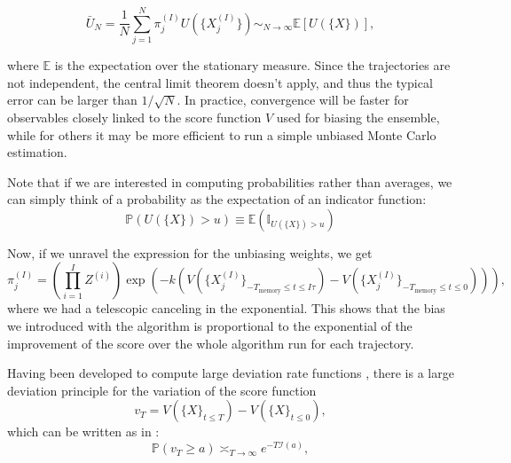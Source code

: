 \begin{equation}\label{eq:veros:unbiased-averaging}
    \bar{U}_N = \frac{1}{N}\sum_{j=1}^N \pi_j^{(I)} U(\{X^{(I)}_j\}) \sim_{N \to \infty} \mathbb{E} \left[ U(\{X\}) \right],
\end{equation}

where $\mathbb{E}$ is the expectation over the stationary measure. Since the trajectories are not independent, the central limit theorem doesn't apply, and thus the typical error can be larger than $1/\sqrt{N}$.
In practice, convergence will be faster for observables closely linked to the score function $V$ used for biasing the ensemble, while for others it may be more efficient to run a simple unbiased Monte Carlo estimation.

Note that if we are interested in computing probabilities rather than averages, we can simply think of a probability as the expectation of an indicator function:
\begin{equation}
    \mathbb{P} \left(U(\{X\}) > u \right) \equiv \mathbb{E} \left( \mathbb{I}_{U(\{X\}) > u}  \right)
\end{equation}

Now, if we unravel the expression for the unbiasing weights, we get
\begin{equation}
    \pi_j^{(I)} = \left(\prod_{i=1}^{I}{Z^{(i)}} \right) \exp \left( -k \left(V(\{X_j^{(I)}\}_{-T_\text{memory} \leq t \leq I\tau}) - V(\{X_j^{(I)}\}_{-T_\text{memory} \leq t \leq 0})\right)  \right),
\end{equation}
where we had a telescopic canceling in the exponential. 
This shows that the bias we introduced with the algorithm is proportional to the exponential of the improvement of the score over the whole algorithm run for each trajectory.

Having been developed to compute large deviation rate functions \cite{GIA06}, there is a large deviation principle for the variation of the score function 
\begin{equation}\label{eq:veros:delta-score}
    v_T = V(\{X\}_{t \leq T}) - V(\{X\}_{t \leq 0}) ,
\end{equation}
which can be written as in \cite{RAG18}:
\begin{equation}\label{eq:veros:large-deviation-principle}
    \mathbb{P} \left( v_T \geq a \right) \asymp_{T \to \infty} e^{-T\mathcal{I}(a)},
\end{equation}

